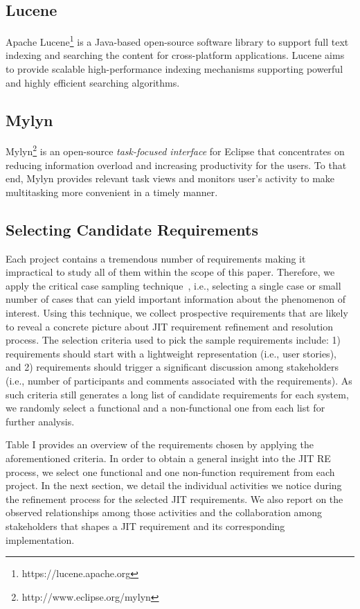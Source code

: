 \documentclass[review]{elsarticle}
\begin{document}
\subsection{Lucene}
Apache Lucene\footnote{https://lucene.apache.org} is a Java-based open-source software library to support full text indexing and searching the content for cross-platform applications. Lucene aims to provide scalable high-performance indexing mechanisms supporting powerful and highly efficient searching algorithms.

\subsection{Mylyn}
Mylyn\footnote{http://www.eclipse.org/mylyn} is an open-source \textit{task-focused interface} for Eclipse that concentrates on reducing information overload and increasing productivity for the users. To that end, Mylyn provides relevant task views and monitors user's activity to make multitasking more convenient in a timely manner.

\subsection{Selecting Candidate Requirements}
Each project contains a tremendous number of requirements making it impractical to study all of them within the scope of this paper. Therefore, we apply the critical case sampling technique~\cite{patton}, i.e., selecting a single case or small number of cases that can yield important information about the phenomenon of interest. Using this technique, we collect prospective requirements that are likely to reveal a concrete picture about JIT requirement refinement and resolution process. The selection criteria used to pick the sample requirements include: 1) requirements should start with a lightweight representation (i.e., user stories), and 2) requirements should trigger a significant discussion among stakeholders (i.e., number of participants and comments associated with the requirements). As such criteria still generates a long list of candidate requirements for each system, we randomly select a functional and a non-functional one from each list for further analysis. %

Table I provides an overview of the requirements chosen by applying the aforementioned criteria. In order to obtain a general insight into the JIT RE process, we select one functional and one non-function requirement from each project. In the next section, we detail the individual activities we notice during the refinement process for the selected JIT requirements. We also report on the observed relationships among those activities and the collaboration among stakeholders that shapes a JIT requirement and its corresponding implementation.
\end{document}
